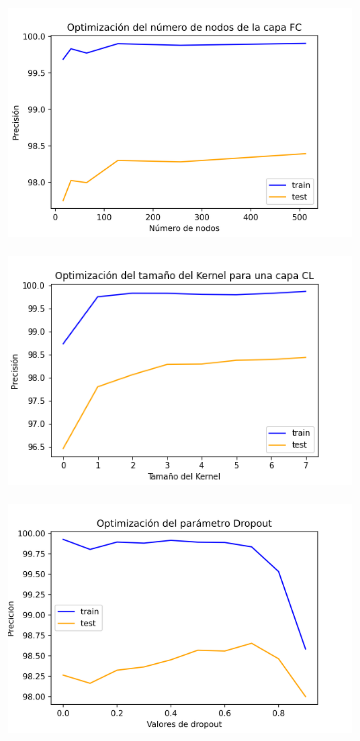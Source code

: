 \documentclass[11pt]{article}
\begin{document}
\begin{figure}[H]
    \centering
    \begin{subfigure}[c]{0.4\textwidth}
        \includegraphics[width=\textwidth]{FCNodes.png}
        \caption{}
        \label{fig:FCNodes}
    \end{subfigure}
    \begin{subfigure}[c]{0.4\textwidth}
        \includegraphics[width=\textwidth]{KernelSize.png}
        \caption{}
        \label{fig:KernelSize}
    \end{subfigure}
    \begin{subfigure}[c]{0.4\textwidth}
        \includegraphics[width=\textwidth]{DropOut.png}

\end{subfigure}
\end{figure}
\end{document}
